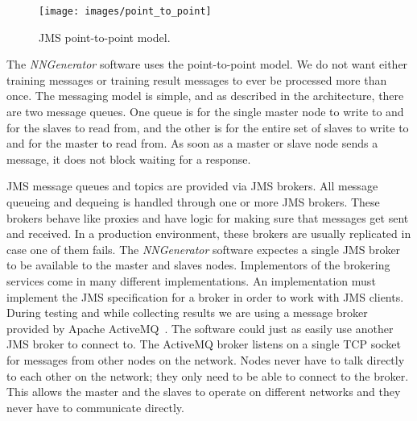 \begin{figure}[htb!]
  \centering
  \texttt{[image: images/point\_to\_point]}
  \caption{JMS point-to-point model.}
  \label{point_to_point}
\end{figure}

The {\em NNGenerator} software uses the point-to-point model.
We do not want either training messages or training result messages to ever be processed more than once.
The messaging model is simple, and as described in the architecture, there are two message queues. 
One queue is for the single master node to write to and for the slaves to read from, and the other is for the entire set of slaves to write to and for the master to read from. 
As soon as a master or slave node sends a message, it does not block waiting for a response. 

JMS message queues and topics are provided via JMS brokers.
All message queueing and dequeing is handled through one or more JMS brokers.
These brokers behave like proxies and have logic for making sure that messages get sent and received.
In a production environment, these brokers are usually replicated in case one of them fails.
The {\em NNGenerator} software expectes a single JMS broker to be available to the master and slaves nodes.
Implementors of the brokering services come in many different implementations. 
An implementation must implement the JMS specification for a broker in order to work with JMS clients.
During testing and while collecting results we are using a message broker provided by Apache ActiveMQ~\cite{activeMQ}.
The software could just as easily use another JMS broker to connect to. 
The ActiveMQ broker listens on a single TCP socket for messages from other nodes on the network. 
Nodes never have to talk directly to each other on the network; they only need to be able to connect to the broker.  
This allows the master and the slaves to operate on different networks and they never have to communicate directly.

